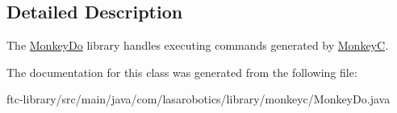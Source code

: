 \subsection{Detailed Description}
The \hyperlink{classcom_1_1lasarobotics_1_1library_1_1monkeyc_1_1_monkey_do}{Monkey\+Do} library handles executing commands generated by \hyperlink{classcom_1_1lasarobotics_1_1library_1_1monkeyc_1_1_monkey_c}{Monkey\+C}. 

The documentation for this class was generated from the following file\+:\begin{DoxyCompactItemize}
\item 
ftc-\/library/src/main/java/com/lasarobotics/library/monkeyc/Monkey\+Do.\+java\end{DoxyCompactItemize}
